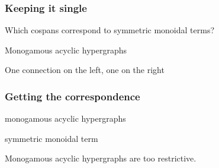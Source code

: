 \begin{frame}
    \frametitle{Keeping it single}

    \Large
    Which cospans correspond to \alert{symmetric monoidal} terms?

    \await

    \centering
    \LARGE
    \alert{Monogamous acyclic} hypergraphs

    \scalebox{0.5}{\hypergraphpeople}

    \normalsize

    One connection on the \alert{left}, one on the \alert{right}

    \await
    \vspace{1em}


\end{frame}
\begin{frame}
    \frametitle{Getting the correspondence}

    \centering

    \begin{minipage}{0.45\textwidth}
        \begin{center}
            \alert{monogamous acyclic} hypergraphs

            \vspace{1em}

        \end{center}
    \end{minipage}
    \quad
    \raisebox{-1em}{\(\leftrightarrow\)}
    \await
    \begin{minipage}{0.45\textwidth}
        \begin{center}
            symmetric monoidal term

            \vspace{1em}

        \end{center}
    \end{minipage}

    \vspace{1em}
    \normalsize
    \scalebox{0.75}{\hypergraphpeople}

    \Large
    \await
    Monogamous acyclic hypergraphs are \alert{too restrictive}.

\end{frame}
